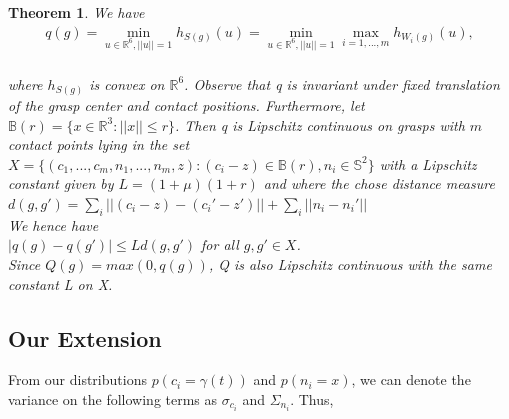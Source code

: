 \documentclass[letterpaper, 10 pt, conference]{ieeeconf}  %
\newtheorem{theorem}{Theorem}
\begin{document}
\begin{theorem}
We have \\

\begin{align}
q(g) = \min_{u\in \mathbb{R}^6, ||u|| =1} h_{S(g)}(u) = \min_{u\in \mathbb{R}^6, ||u|| =1} \max_{i=1,...,m} h_{W_i(g)}(u),\\
\end{align}

where $h_{S(g)}$ is convex on $\mathbb{R}^6$. Observe that q is invariant under fixed translation of the grasp center and contact positions. Furthermore, let $\mathbb{B}(r) = \lbrace x \in \mathbb{R}^3 : ||x|| \leq r \rbrace$. Then q is Lipschitz continuous on grasps with $m$ contact points lying in the set $X = \lbrace (c_1,...,c_m,n_1,...,n_m,z) : (c_i-z) \in \mathbb{B}(r), n_i \in \mathbb{S}^2 \rbrace$ with a Lipschitz constant given by $L= (1+\mu)(1+r)$ and where the chose distance measure \\

$d(g,g') = \sum_i ||(c_i-z)-(c_i'-z')|| + \sum_i ||n_i - n_i'||$\\

We hence have \\

$|q(g) - q(g')| \leq Ld(g,g')$ for all $g,g' \in X$. \\

Since $Q(g) = max(0,q(g))$, Q is also Lipschitz continuous with the same constant L on X. 
\end{theorem}

\subsection{Our Extension}
From our distributions $p(c_i=\gamma(t))$ and $p(n_i = x)$, we can denote the variance on the following terms as $\sigma_{c_i}$ and $\Sigma_{n_i}$. Thus, 
\end{document}
